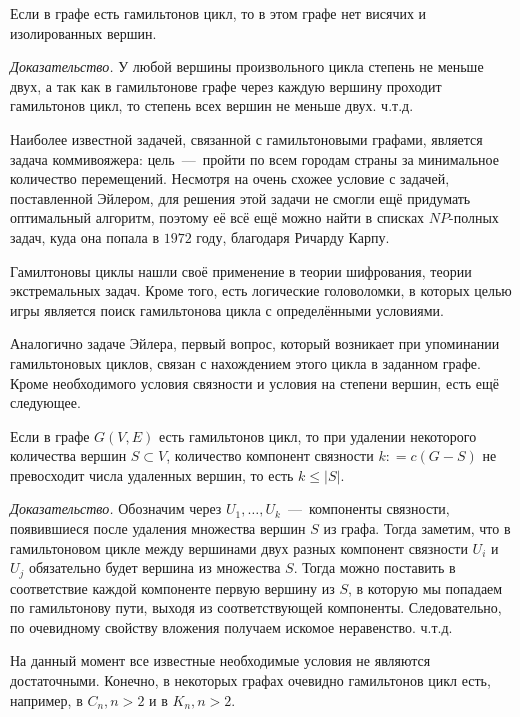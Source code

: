 \begin{statement}
	Если в графе есть гамильтонов цикл, то в этом графе нет висячих и изолированных вершин.
	
	\emph{Доказательство.} У любой вершины произвольного цикла степень не меньше двух, а так как в гамильтонове графе через каждую вершину проходит гамильтонов цикл, то степень всех вершин не меньше двух. ч.т.д.
\end{statement}

	Наиболее известной задачей, связанной с гамильтоновыми графами, является задача коммивояжера: цель~---~пройти по всем городам страны за минимальное количество перемещений. Несмотря на очень схожее условие с задачей, поставленной Эйлером, для решения этой задачи не смогли ещё придумать оптимальный алгоритм, поэтому её всё ещё можно найти в списках $NP$-полных задач, куда она попала в $1972$ году, благодаря Ричарду Карпу.

	Гамилтоновы циклы нашли своё применение в теории шифрования, теории экстремальных задач. Кроме того, есть логические головоломки, в которых целью игры является поиск гамильтонова цикла с определёнными условиями.
	
	Аналогично задаче Эйлера, первый вопрос, который возникает при упоминании гамильтоновых циклов, связан с нахождением этого цикла в заданном графе. Кроме необходимого условия связности и условия на степени вершин, есть ещё следующее.
	
\begin{statement}
	Если в графе $G(V, E)$ есть гамильтонов цикл, то при удалении некоторого количества вершин $S \subset V$, количество компонент связности $k \colon= c(G-S)$ не превосходит числа удаленных вершин, то есть $k \leqslant |S|$.
	
	\emph{Доказательство.} Обозначим через $U_1, \dots, U_k$~---~компоненты связности, появившиеся после удаления множества вершин $S$ из графа. Тогда заметим, что в гамильтоновом цикле между вершинами двух разных компонент связности $U_i$ и $U_j$ обязательно будет вершина из множества $S$. Тогда можно поставить в соответствие каждой компоненте первую вершину из $S$, в которую мы попадаем по гамильтонову пути, выходя из соответствующей компоненты. Следовательно, по очевидному свойству вложения получаем искомое неравенство. ч.т.д.
\end{statement}

	На данный момент все известные необходимые условия не являются достаточными. Конечно, в некоторых графах очевидно гамильтонов цикл есть, например, в $C_n, n > 2$ и в $K_n, n > 2$.
	
